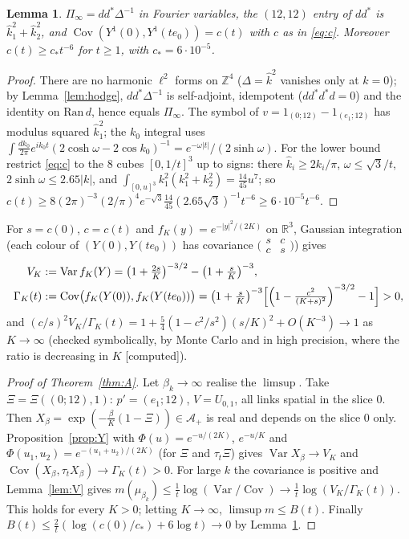 \documentclass[11pt,a4paper]{article}
\theoremstyle{plain}
\newtheorem{lemma}[theorem]{Lemma}
\theoremstyle{definition}
\theoremstyle{remark}
\numberwithin{equation}{section}
\newcommand{\R}{\mathbb{R}}
\newcommand{\Z}{\mathbb{Z}}
\newcommand{\Var}{\operatorname{Var}}
\newcommand{\Cov}{\operatorname{Cov}}
\newcommand{\st}[1]{\textsf{[#1]}}
\begin{document}
\begin{lemma}\label{lem:free}
$\Pi_\infty=dd^*\Delta^{-1}$ in Fourier variables, the $(12,12)$ entry of $dd^*$ is $\hat k_1^2+\hat k_2^2$, and $\Cov(Y^1(0),Y^1(te_0))=c(t)$
with $c$ as in \eqref{eq:c}. Moreover $c(t)\ge c_*t^{-6}$ for $t\ge1$, with $c_*=6\cdot10^{-5}$.
\end{lemma}
\begin{proof}
There are no harmonic $\ell^2$ forms on $\Z^4$ ($\Delta=\hat k^2$ vanishes only at $k=0$); by Lemma~\ref{lem:hodge}, $dd^*\Delta^{-1}$ is
self-adjoint, idempotent ($dd^*d^*d=0$) and the identity on $\mathrm{Ran}\,d$, hence equals $\Pi_\infty$. The symbol of
$v=1_{(0;12)}-1_{(e_1;12)}$ has modulus squared $\hat k_1^2$; the $k_0$ integral uses
$\int\frac{dk_0}{2\pi}e^{ik_0t}(2\cosh\omega-2\cos k_0)^{-1}=e^{-\omega|t|}/(2\sinh\omega)$. For the lower bound restrict \eqref{eq:c} to the
$8$ cubes $[0,1/t]^3$ up to signs: there $\hat k_i\ge2k_i/\pi$, $\omega\le\sqrt3/t$, $2\sinh\omega\le2.65|k|$, and
$\int_{[0,u]^3}k_1^2(k_1^2+k_2^2)=\frac{14}{45}u^7$; so $c(t)\ge8(2\pi)^{-3}(2/\pi)^4e^{-\sqrt3}\frac{14}{45}(2.65\sqrt3)^{-1}t^{-6}\ge6\cdot10^{-5}t^{-6}$.
\end{proof}

For $s=c(0)$, $c=c(t)$ and $f_K(y)=e^{-|y|^2/(2K)}$ on $\R^3$, Gaussian integration (each colour of $(Y(0),Y(te_0))$ has covariance
$\bigl(\begin{smallmatrix}s&c\\c&s\end{smallmatrix}\bigr)$) gives
\begin{equation}\label{eq:VG}
\begin{aligned}
V_K&:=\Var f_K(Y)=\bigl(1+\tfrac{2s}K\bigr)^{-3/2}-\bigl(1+\tfrac sK\bigr)^{-3},\\
\Gamma_K(t)&:=\Cov\bigl(f_K(Y(0)),f_K(Y(te_0))\bigr)=\bigl(1+\tfrac sK\bigr)^{-3}\Bigl[\Bigl(1-\tfrac{c^2}{(K+s)^2}\Bigr)^{-3/2}-1\Bigr]>0,
\end{aligned}
\end{equation}
and $(c/s)^2V_K/\Gamma_K(t)=1+\frac54(1-c^2/s^2)(s/K)^2+O(K^{-3})\to1$ as $K\to\infty$ (checked symbolically, by Monte Carlo and in
high precision, where the ratio is decreasing in $K$ \st{computed}).

\begin{proof}[Proof of Theorem~\ref{thm:A}]
Let $\beta_k\to\infty$ realise the $\limsup$. Take $\Xi=\Xi((0;12),1)$: $p'=(e_1;12)$, $V=U_{0,1}$, all links spatial in the slice $0$. Then
$X_\beta=\exp(-\frac\beta K(1-\Xi))\in\mathcal A_+$ is real and depends on the slice $0$ only. Proposition~\ref{prop:Y} with
$\Phi(u)=e^{-u/(2K)}$, $e^{-u/K}$ and $\Phi(u_1,u_2)=e^{-(u_1+u_2)/(2K)}$ (for $\Xi$ and $\tau_t\Xi$) gives $\Var X_\beta\to V_K$ and
$\Cov(X_\beta,\tau_tX_\beta)\to\Gamma_K(t)>0$. For large $k$ the covariance is positive and Lemma~\ref{lem:V} gives
$m(\mu_{\beta_k})\le\frac1t\log(\Var/\Cov)\to\frac1t\log(V_K/\Gamma_K(t))$. This holds for every $K>0$; letting $K\to\infty$,
$\limsup m\le B(t)$. Finally $B(t)\le\frac2t(\log(c(0)/c_*)+6\log t)\to0$ by Lemma~\ref{lem:free}.
\end{proof}
\end{document}

